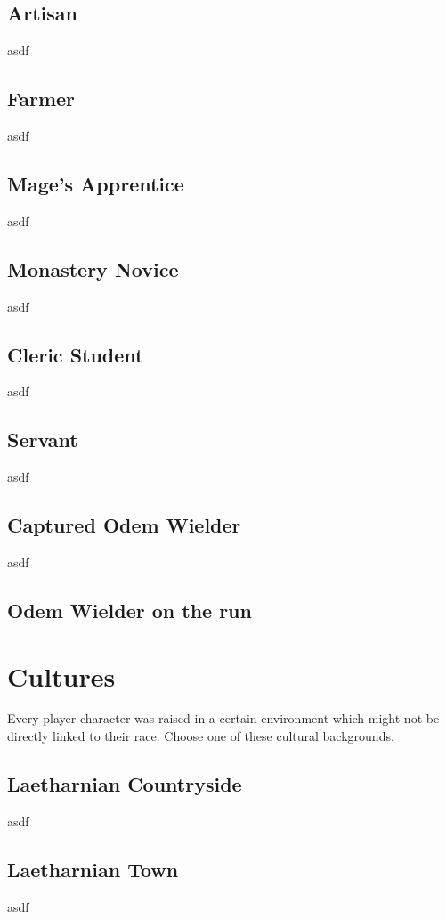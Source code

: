 \section{Artisan}
asdf

\section{Farmer}
asdf

\section{Mage's Apprentice}
asdf

\section{Monastery Novice}
asdf

\section{Cleric Student}
asdf

\section{Servant}
asdf

\section{Captured Odem Wielder}
asdf

\section{Odem Wielder on the run}


\chapter{Cultures}
Every player character was raised in a certain environment which might not be directly linked to their race.
Choose one of these cultural backgrounds.\\

\section{Laetharnian Countryside}
asdf

\section{Laetharnian Town}
asdf

